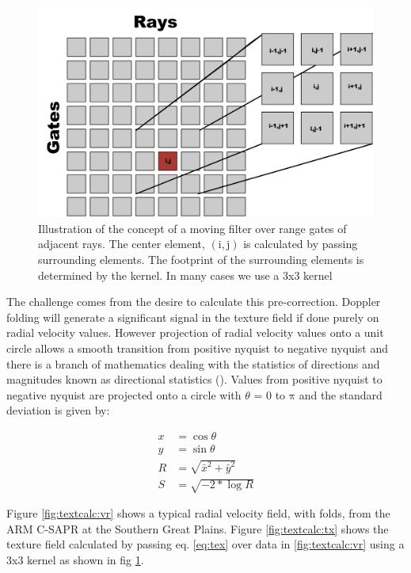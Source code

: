 \documentclass[twocol]{ametsoc}
\begin{document}
\begin{figure}[h]
    \centering
    \includegraphics[width=0.8\columnwidth]{grid.png}
    \caption{Illustration of the concept of a moving filter over range gates of adjacent rays. 
    The center element, $\mathrm{(i,j)}$ is calculated by passing surrounding elements. 
    The footprint of the surrounding elements is determined by the kernel. In many cases we use a 3x3 kernel}
    \label{fig:grid}
\end{figure}

The challenge comes from the desire to calculate this pre-correction. Doppler folding will generate a 
significant signal in the texture field if done purely on radial velocity values. However projection of radial 
velocity values onto a unit circle allows a smooth transition from positive nyquist to negative nyquist 
and there is a branch of mathematics dealing with the statistics of directions and magnitudes known
 as directional statistics (\cite{wiki:dstats}). Values from positive nyquist to negative nyquist are projected
  onto a circle with $\theta$ = 0 to $\mathrm{\pi}$ and the standard deviation is given by:

\begin{align}
x &= \cos{\theta}\\
y &= \sin{\theta}\\
R &= \sqrt{\bar{x}^2 + \bar{y}^2}\\ 
S &= \sqrt{-2 * \log{R}}
\label{eq:tex}
\end{align}

Figure \ref{fig:textcalc:vr} shows a typical radial velocity field, with folds, from the ARM C-SAPR at the Southern Great Plains. Figure \ref{fig:textcalc:tx} shows the texture field calculated by passing eq. \ref{eq:tex} over data in \ref{fig:textcalc:vr} using a 3x3 kernel as shown in fig \ref{fig:grid}. 
\end{document}

